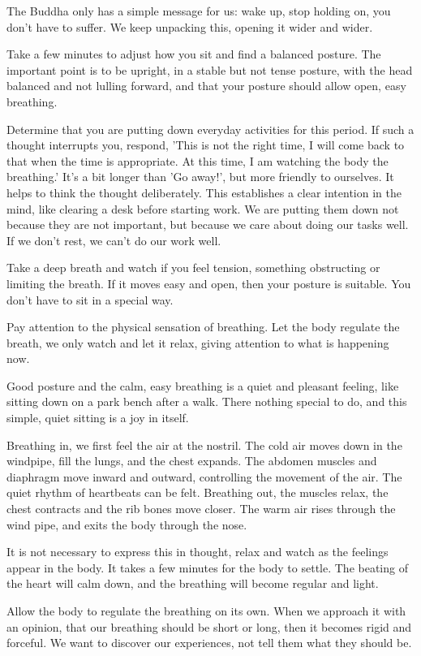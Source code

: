 The Buddha only has a simple message for us: wake up, stop holding on,
you don't have to suffer. We keep unpacking this, opening it wider and
wider.

Take a few minutes to adjust how you sit and find a balanced posture.
The important point is to be upright, in a stable but not tense posture,
with the head balanced and not lulling forward, and that your posture
should allow open, easy breathing.

Determine that you are putting down everyday activities for this period.
If such a thought interrupts you, respond, 'This is not the right time,
I will come back to that when the time is appropriate. At this time, I
am watching the body the breathing.' It's a bit longer than 'Go away!',
but more friendly to ourselves. It helps to think the thought
deliberately. This establishes a clear intention in the mind, like
clearing a desk before starting work. We are putting them down not
because they are not important, but because we care about doing our
tasks well. If we don't rest, we can't do our work well.

Take a deep breath and watch if you feel tension, something obstructing
or limiting the breath. If it moves easy and open, then your posture is
suitable. You don't have to sit in a special way.

Pay attention to the physical sensation of breathing. Let the body
regulate the breath, we only watch and let it relax, giving attention to
what is happening now.

Good posture and the calm, easy breathing is a quiet and pleasant
feeling, like sitting down on a park bench after a walk. There nothing
special to do, and this simple, quiet sitting is a joy in itself.

Breathing in, we first feel the air at the nostril. The cold air moves
down in the windpipe, fill the lungs, and the chest expands. The abdomen
muscles and diaphragm move inward and outward, controlling the movement
of the air. The quiet rhythm of heartbeats can be felt. Breathing out,
the muscles relax, the chest contracts and the rib bones move closer.
The warm air rises through the wind pipe, and exits the body through the
nose.

It is not necessary to express this in thought, relax and watch as the
feelings appear in the body. It takes a few minutes for the body to
settle. The beating of the heart will calm down, and the breathing will
become regular and light.

Allow the body to regulate the breathing on its own. When we approach it
with an opinion, that our breathing should be short or long, then it
becomes rigid and forceful. We want to discover our experiences, not
tell them what they should be.

